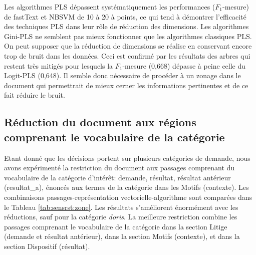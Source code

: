  Les algorithmes PLS dépassent systématiquement les performances ($F_1$-mesure) de fastText et
NBSVM de 10 à 20 à points, ce qui tend à démontrer l'efficacité des techniques PLS dans leur
rôle de réduction des dimensions. Les algorithmes Gini-PLS ne semblent pas mieux
fonctionner que les algorithmes classiques PLS. On peut supposer que la réduction de
dimensions se réalise en conservant encore trop de bruit dans les données. Ceci est confirmé
par les résultats des arbres qui restent très mitigés pour lesquels la $F_1$-mesure (0,668) dépasse à
peine celle du Logit-PLS (0,648). Il semble donc nécessaire de procéder à un zonage dans le
document qui permettrait de mieux cerner les informations pertinentes et de ce fait réduire le
bruit.

\subsection{Réduction du document aux régions comprenant le vocabulaire de la catégorie}
Etant donné que les décisions portent sur plusieurs catégories de demande, nous avons expérimenté la restriction du document aux passages comprenant du vocabulaire de la catégorie d'intérêt: demande, résultat, résultat antérieur (resultat\_a), énoncés aux termes de la catégorie dans les Motifs (contexte). Les combinaisons passages-représentation vectorielle-algorithme sont comparées dans le Tableau \ref{tab:sensrst:zone}. Les résultats s'améliorent énormément avec les réductions, sauf pour la catégorie \textit{doris}. La meilleure restriction combine les passages comprenant le vocabulaire de la catégorie dans la section Litige (demande et résultat antérieur), dans la section Motifs (contexte), et dans la section Dispositif (résultat).
